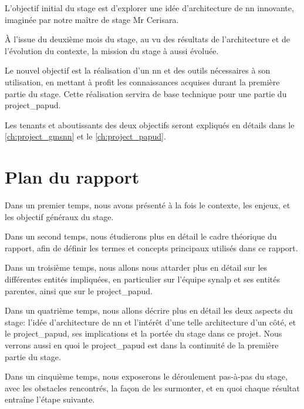 L'objectif initial du stage est d'explorer une idée d'architecture de \gls{nn} innovante, imaginée par notre maître de stage Mr Cerisara.

À l'issue du deuxième mois du stage, au vu des résultats de l'architecture et de l'évolution du contexte, la mission du stage à aussi évoluée.

Le nouvel objectif est la réalisation d'un \gls{nn} et des outils nécessaires à son utilisation, en mettant à profit les connaissances acquises durant la première partie du stage.
Cette réalisation servira de base technique pour une partie du \gls{project_papud}.

Les tenants et aboutissants des deux objectifs seront expliqués en détails dans le \autoref{ch:project_gmsnn} et le \autoref{ch:project_papud}.

\section[Plan]{Plan du rapport}

Dans un premier temps, nous avons présenté à la fois le contexte, les enjeux, et les objectif généraux du stage.

Dans un second temps, nous étudierons plus en détail le cadre théorique du rapport, afin de définir les termes et concepts principaux utilisés dans ce rapport.

Dans un troisième temps, nous allons nous attarder plus en détail sur les différentes entités impliquées, en particulier sur l'équipe \gls{synalp} et ses entités parentes, ainsi que sur le \gls{project_papud}.

Dans un quatrième temps, nous allons décrire plus en détail les deux aspects du stage: l'idée d'architecture de \gls{nn} et l'intérêt d'une telle architecture d'un côté, et le \gls{project_papud}, ses implications et la portée du stage dans ce projet. Nous verrons aussi en quoi le \gls{project_papud} est dans la continuité de la première partie du stage.

Dans un cinquième temps, nous exposerons le déroulement pas-à-pas du stage, avec les obstacles rencontrés, la façon de les surmonter, et en quoi chaque résultat entraîne l'étape suivante. 

